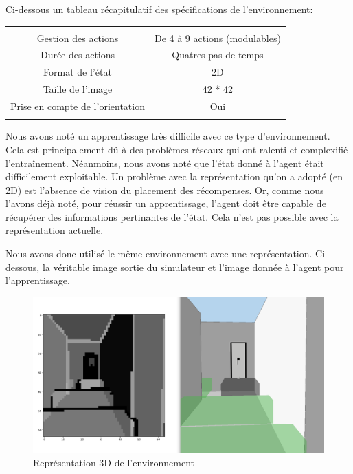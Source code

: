 Ci-dessous un tableau récapitulatif des spécifications de l'environnement:


\begin{center}
    \begin{tabular}{|c|c|}
    \Xhline{2\arrayrulewidth}
    \multicolumn{2}{|c|}{Spécifications} \\
    \Xhline{2\arrayrulewidth}
    Gestion des actions & De 4 à 9 actions (modulables) \footnotemark\\
    Durée des actions & Quatres pas de temps \\
    Format de l'état&2D\\
    Taille de l'image & 42 * 42\\
    Prise en compte de l'orientation& Oui\footnotemark\\
    \Xhline{2\arrayrulewidth}
\end{tabular}
\end{center}


Nous avons noté un apprentissage très difficile avec ce type d'environnement. Cela est principalement dû à des problèmes réseaux qui ont ralenti et complexifié l'entraînement. Néanmoins, nous avons noté que l'état donné à l'agent était difficilement exploitable. Un problème avec la représentation qu'on a adopté (en 2D) est l'absence de vision du placement des récompenses. Or, comme nous l'avons déjà noté, pour réussir un apprentissage, l'agent doit être capable de récupérer des informations pertinantes de l'état. Cela n'est pas possible avec la représentation actuelle.

Nous avons donc utilisé le même environnement avec une représentation. Ci-dessous, la véritable image sortie du simulateur et l'image donnée à l'agent pour l'apprentissage.

\begin{figure}[h!]
    \begin{center}
\includegraphics[scale=.15]{./assets/SESTAR/se2.png}
\caption{Représentation 3D de l'environnement}
\end{center}
\end{figure}

